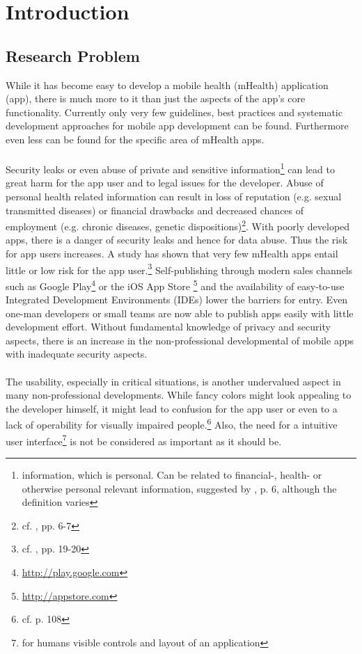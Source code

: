 \section{Introduction}
\subsection{Research Problem}
While it has become easy to develop a mobile health (mHealth) application (app), there is much more to it than just the aspects of the app's core functionality. Currently only very few guidelines, best practices and systematic development approaches for mobile app development can be found. Furthermore even less can be found for the specific area of mHealth apps.
\\
\\
Security leaks or even abuse of private and sensitive information\footnote{information, which is personal. Can be related to financial-, health- or otherwise personal relevant information, suggested by \cite{FutureofPrivacyForumCenterforDemocracy&Technology.2011}, p. 6, although the definition varies} can lead to great harm for the app user and to legal issues for the developer. Abuse of personal health related information can result in loss of reputation (e.g. sexual transmitted diseases) or financial drawbacks and decreased chances of employment (e.g. chronic diseases, genetic dispositions)\footnote{cf. \cite{Dehling.2013}, pp. 6-7}. With poorly developed apps, there is a danger of security leaks and hence for data abuse. Thus the risk for app users increases. A study has shown that very few mHealth apps entail little or low risk for the app user.\footnote{cf. \cite{Njie.2013}, pp. 19-20} Self-publishing through modern sales channels such as Google Play\footnote{\url{http://play.google.com}} or the iOS App Store \footnote{\url{http://appstore.com}} and the availability of easy-to-use Integrated Development Environments (IDEs) lower the barriers for entry. Even one-man developers or small teams are now able to publish apps easily with little development effort. Without fundamental knowledge of privacy and security aspects, there is an increase in the non-professional developmental of mobile apps with inadequate security aspects.
\\
\\
The usability, especially in critical situations, is another undervalued aspect in many non-professional developments. While fancy colors might look appealing to the developer himself, it might lead to confusion for the app user or even to a lack of operability for visually impaired people.\footnote{cf. \cite{Badashian.2008} p. 108} Also, the need for a intuitive user interface\footnote{for humans visible controls and layout of an application} is not be considered as important as it should be.
